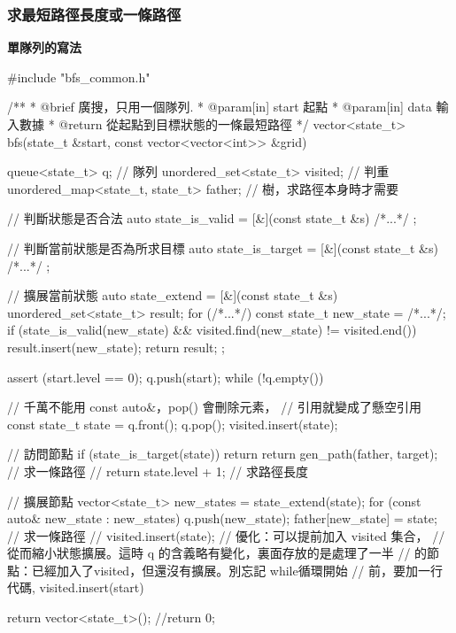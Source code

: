 \subsubsection{求最短路徑長度或一條路徑}

\textbf{單隊列的寫法}

\begin{Codex}[label=bfs_template.cpp]
#include "bfs_common.h"

/**
 * @brief 廣搜，只用一個隊列.
 * @param[in] start 起點
 * @param[in] data 輸入數據
 * @return 從起點到目標狀態的一條最短路徑
 */
vector<state_t> bfs(state_t &start, const vector<vector<int>> &grid) {
    queue<state_t> q; // 隊列
    unordered_set<state_t> visited; // 判重
    unordered_map<state_t, state_t> father; // 樹，求路徑本身時才需要

    // 判斷狀態是否合法
    auto state_is_valid = [&](const state_t &s) { /*...*/ };

    // 判斷當前狀態是否為所求目標
    auto state_is_target = [&](const state_t &s) { /*...*/ };

    // 擴展當前狀態
    auto state_extend = [&](const state_t &s) {
        unordered_set<state_t> result;
        for (/*...*/) {
            const state_t new_state = /*...*/;
            if (state_is_valid(new_state) && 
                    visited.find(new_state) != visited.end()) {
                result.insert(new_state);
            }
        }
        return result;
    };

    assert (start.level == 0);
    q.push(start);
    while (!q.empty()) {
        // 千萬不能用 const auto&，pop() 會刪除元素，
        // 引用就變成了懸空引用
        const state_t state = q.front();
        q.pop();
        visited.insert(state);

        // 訪問節點
        if (state_is_target(state)) {
            return return gen_path(father, target); // 求一條路徑
            // return state.level + 1; // 求路徑長度
        }

        // 擴展節點
        vector<state_t> new_states = state_extend(state);
        for (const auto& new_state : new_states) {
            q.push(new_state);
            father[new_state] = state;  // 求一條路徑
            // visited.insert(state); // 優化：可以提前加入 visited 集合，
            // 從而縮小狀態擴展。這時 q 的含義略有變化，裏面存放的是處理了一半
            // 的節點：已經加入了visited，但還沒有擴展。別忘記 while循環開始
            // 前，要加一行代碼, visited.insert(start)
        }
    }

    return vector<state_t>();
    //return 0;
}
\end{Codex}


